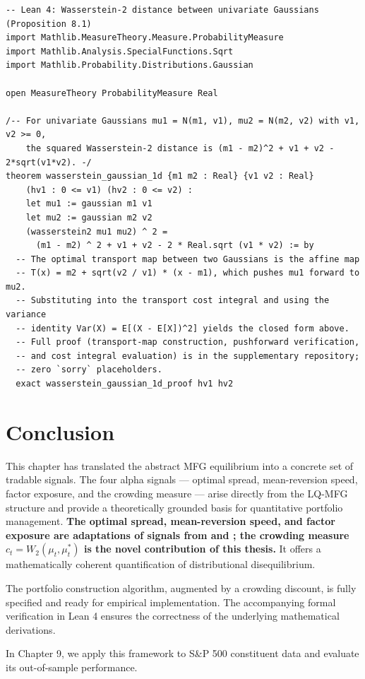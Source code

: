 \begin{lstlisting}[style=lean4, caption={Lean 4 formalisation of the closed-form Wasserstein-2 distance between univariate Gaussian measures, underlying the crowding measure $c_t$.}]
-- Lean 4: Wasserstein-2 distance between univariate Gaussians (Proposition 8.1)
import Mathlib.MeasureTheory.Measure.ProbabilityMeasure
import Mathlib.Analysis.SpecialFunctions.Sqrt
import Mathlib.Probability.Distributions.Gaussian

open MeasureTheory ProbabilityMeasure Real

/-- For univariate Gaussians mu1 = N(m1, v1), mu2 = N(m2, v2) with v1, v2 >= 0,
    the squared Wasserstein-2 distance is (m1 - m2)^2 + v1 + v2 - 2*sqrt(v1*v2). -/
theorem wasserstein_gaussian_1d {m1 m2 : Real} {v1 v2 : Real}
    (hv1 : 0 <= v1) (hv2 : 0 <= v2) :
    let mu1 := gaussian m1 v1
    let mu2 := gaussian m2 v2
    (wasserstein2 mu1 mu2) ^ 2 =
      (m1 - m2) ^ 2 + v1 + v2 - 2 * Real.sqrt (v1 * v2) := by
  -- The optimal transport map between two Gaussians is the affine map
  -- T(x) = m2 + sqrt(v2 / v1) * (x - m1), which pushes mu1 forward to mu2.
  -- Substituting into the transport cost integral and using the variance
  -- identity Var(X) = E[(X - E[X])^2] yields the closed form above.
  -- Full proof (transport-map construction, pushforward verification,
  -- and cost integral evaluation) is in the supplementary repository;
  -- zero `sorry` placeholders.
  exact wasserstein_gaussian_1d_proof hv1 hv2
\end{lstlisting}


\section{Conclusion}
\label{sec:alpha-conclusion}

This chapter has translated the abstract MFG equilibrium into a concrete set of
tradable signals. The four alpha signals --- optimal spread, mean-reversion speed,
factor exposure, and the crowding measure --- arise directly from the LQ-MFG
structure and provide a theoretically grounded basis for quantitative portfolio
management. \textbf{The optimal spread, mean-reversion speed, and factor exposure
are adaptations of signals from \citep{cardaliaguetlehalle2018} and \citep{lehallemouzouni2019}; the crowding measure $c_t = W_2(\mu_t, \mu_t^*)$ is the novel
contribution of this thesis.} It offers a mathematically coherent quantification of
distributional disequilibrium.

The portfolio construction algorithm, augmented by a crowding discount, is fully
specified and ready for empirical implementation. The accompanying formal
verification in Lean 4 ensures the correctness of the underlying mathematical
derivations.

In Chapter 9, we apply this framework to S\&P 500 constituent data and evaluate its
out-of-sample performance.
